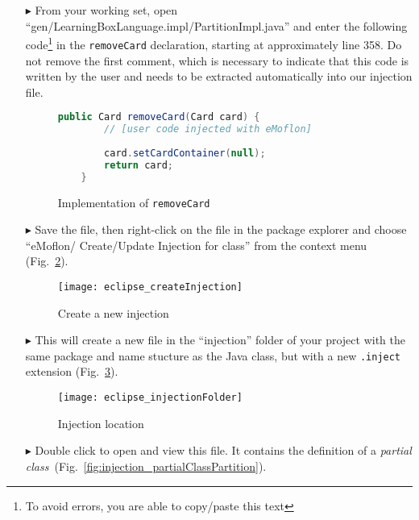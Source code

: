 \begin{itemize}


\item[$\blacktriangleright$] From your working set, open ``gen/LearningBoxLanguage.impl/PartitionImpl.java'' and enter the following code\footnote{To avoid
errors, you are able to copy/paste this text} in the \texttt{removeCard} declaration, starting at approximately line 358. Do not remove the first comment,
which is necessary to indicate that this code is written by the user and needs to be extracted automatically into our injection file.

\begin{figure}[htbp]
        \centering
        \begin{lstlisting}[language=Java, keywordstyle={\bfseries\color{purple}}, backgroundcolor=\color{white}]
    public Card removeCard(Card card) {
        // [user code injected with eMoflon]
        
        card.setCardContainer(null);
        return card;
    }
        \end{lstlisting}
        \caption{Implementation of \texttt{removeCard}}
        \label{fig:addToStringRep_impl}
\end{figure}

\item[$\blacktriangleright$] Save the file, then right-click on the file in the package explorer and choose ``eMoflon/ Create/Update Injection for class'' from
the context menu (Fig.~\ref{fig:injection_create_injection}).

\begin{figure}[htbp]
    \centering
    \texttt{[image: eclipse\_createInjection]}
    \caption{Create a new injection}
    \label{fig:injection_create_injection}
\end{figure}
    
\item[$\blacktriangleright$] This will create a new file in the ``injection'' folder of your project with the same package and name stucture as the Java class,
but with a new \texttt{.inject} extension (Fig.~\ref{fig:injection_folder}).

\begin{figure}[htbp]
    \centering
    \texttt{[image: eclipse\_injectionFolder]}
    \caption{Injection location}
    \label{fig:injection_folder}
\end{figure}

\item[$\blacktriangleright$] Double click to open and view this file. It contains the definition of a \textit{partial
class}~(Fig.~\ref{fig:injection_partialClassPartition}). 


\end{itemize}
